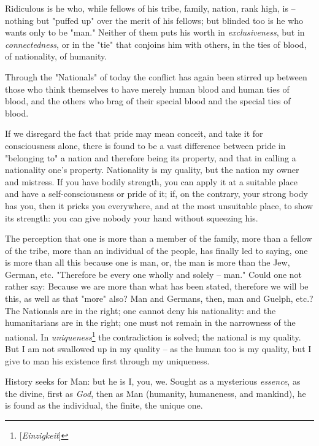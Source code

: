 Ridiculous is he who, while fellows of his tribe, family, nation, rank high, 
is -- nothing but "{}puffed up"{} over the merit of his fellows; but blinded 
too is he who wants only to be "{}man."{} Neither of them puts his worth in 
\textit{exclusiveness}, but in \textit{connectedness}, or in the "{}tie"{} 
that conjoins him with others, in the ties of blood, of nationality, of 
humanity.

Through the "{}Nationals"{} of today the conflict has again been stirred up 
between those who think themselves to have merely human blood and human ties 
of blood, and the others who brag of their special blood and the special ties 
of blood.

If we disregard the fact that pride may mean conceit, and take it for 
consciousness alone, there is found to be a vast difference between pride in 
"{}belonging to"{} a nation and therefore being its property, and that in 
calling a nationality one's property. Nationality is my quality, but the 
nation my owner and mistress. If you have bodily strength, you can apply it at 
a suitable place and have a self-consciousness or pride of it; if, on the 
contrary, your strong body has you, then it pricks you everywhere, and at the 
most unsuitable place, to show its strength: you can give nobody your hand 
without squeezing his.

The perception that one is more than a member of the family, more than a 
fellow of the tribe, more than an individual of the people, has finally led to 
saying, one is more than all this because one is man, or, the man is more than 
the Jew, German, etc. "{}Therefore be every one wholly and solely -- man."{} 
Could one not rather say: Because we are more than what has been stated, 
therefore we will be this, as well as that "{}more"{} also? Man and Germans, 
then, man and Guelph, etc.? The Nationals are in the right; one cannot deny 
his nationality: and the humanitarians are in the right; one must not remain 
in the narrowness of the national. In 
\textit{uniqueness}\footnote{[\textit{Einzigkeit}]} the contradiction is 
solved; the national is my quality. But I am not swallowed up in my quality -- 
as the human too is my quality, but I give to man his existence first through 
my uniqueness.

History seeks for Man: but he is I, you, we. Sought as a mysterious 
\textit{essence}, as the divine, first as \textit{God}, then as Man (humanity, 
humaneness, and mankind), he is found as the individual, the finite, the 
unique one.

